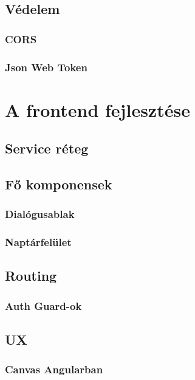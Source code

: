 \documentclass[a4paper,12pt]{report}
\theoremstyle{definition}
\theoremstyle{remark}
\begin{document}
\section{Védelem}

\subsection{CORS}

\subsection{Json Web Token}

\chapter{A frontend fejlesztése}

\section{Service réteg}

\section{Fő komponensek}

\subsection{Dialógusablak}

\subsection{Naptárfelület}

\section{Routing}

	\subsection{Auth Guard-ok}

\section{UX}

	\subsection{Canvas Angularban}
\end{document}
